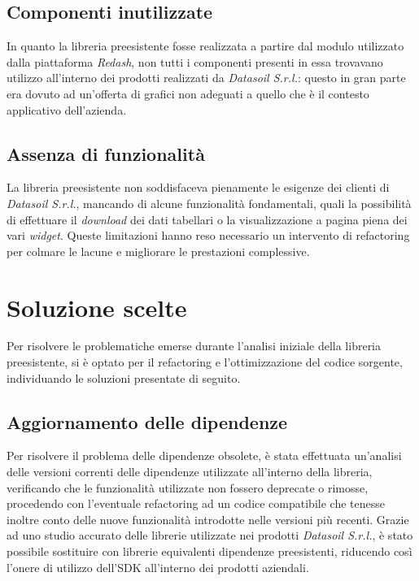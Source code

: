 \subsection{Componenti inutilizzate}
In quanto la libreria preesistente fosse realizzata a partire dal modulo utilizzato dalla piattaforma \textit{Redash}, non tutti i componenti presenti
in essa trovavano utilizzo all'interno dei prodotti realizzati da \textit{Datasoil S.r.l.}: questo in gran parte era dovuto ad un'offerta di grafici non adeguati
a quello che è il contesto applicativo dell'azienda.

\subsection{Assenza di funzionalità}
La libreria preesistente non soddisfaceva pienamente le esigenze dei clienti di \textit{Datasoil S.r.l.}, mancando di alcune funzionalità fondamentali,
quali la possibilità di effettuare il \textit{download} dei dati tabellari o la visualizzazione a pagina piena dei vari \textit{widget}.
Queste limitazioni hanno reso necessario un intervento di refactoring per colmare le lacune e migliorare le prestazioni complessive.

\section{Soluzione scelte}
Per risolvere le problematiche emerse durante l'analisi iniziale della libreria preesistente, si è optato per il refactoring e l'ottimizzazione
del codice sorgente, individuando le soluzioni presentate di seguito.

\subsection{Aggiornamento delle dipendenze}
Per risolvere il problema delle dipendenze obsolete, è stata effettuata un'analisi delle versioni correnti delle dipendenze utilizzate all'interno della libreria,
verificando che le funzionalità utilizzate non fossero deprecate o rimosse, procedendo con l'eventuale refactoring ad un codice compatibile che tenesse inoltre conto
delle nuove funzionalità introdotte nelle versioni più recenti. \newline
Grazie ad uno studio accurato delle librerie utilizzate nei prodotti \textit{Datasoil S.r.l.}, è stato possibile sostituire con librerie equivalenti dipendenze preesistenti,
riducendo così l'onere di utilizzo dell'SDK all'interno dei prodotti aziendali.

